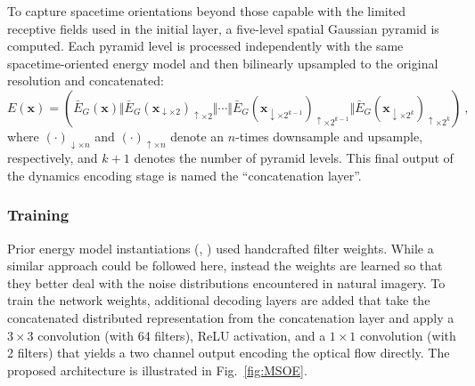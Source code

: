 To capture spacetime orientations beyond those capable
with the limited receptive fields used in the initial
layer, a five-level spatial Gaussian pyramid is computed.
Each pyramid level is processed independently
with the same spacetime-oriented energy model and then
bilinearly upsampled to the original resolution and
concatenated:
\begin{equation}
	E(\mathbf{x}) = \left( \bar{E}_G(\mathbf{x}) \Vert \bar{E}_G(\mathbf{x}_{\downarrow\times2})_{\uparrow\times2} \Vert \cdots \Vert \bar{E}_G(\mathbf{x}_{\downarrow\times2^{k-1}})_{\uparrow\times2^{k-1}} \Vert \bar{E}_G(\mathbf{x}_{\downarrow\times2^k})_{\uparrow\times2^k} \right)\ ,
\end{equation}
where $(\cdot)_{\downarrow \times n}$ and $(\cdot)_{\uparrow \times n}$ denote an $n$-times downsample and upsample, respectively, and $k+1$ denotes the number of pyramid levels. This final output of the dynamics encoding stage is named the ``concatenation layer''.

\subsubsection{Training}

Prior energy model instantiations (\eg,
\cite{adelson1985spatiotemporal,derpanis2012spacetime,simoncelli1998})
used handcrafted filter weights.
While a similar approach could be followed here, instead the weights
are learned so that they better deal with the noise distributions encountered in natural imagery.
To train the network weights, additional decoding
layers are added that take the concatenated distributed
representation from the concatenation layer and apply a $3\times 3$ convolution
(with 64 filters), ReLU activation, and a $1\times 1$
convolution (with 2 filters) that yields a two channel
output encoding the optical flow directly. 
The proposed architecture is illustrated in
Fig.\ \ref{fig:MSOE}.



